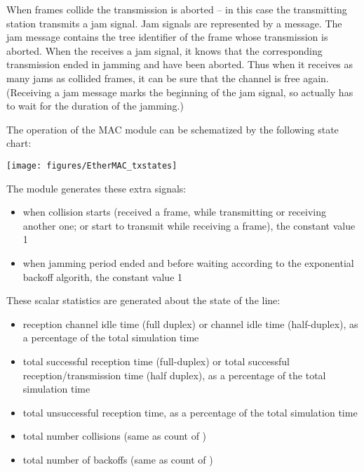 When frames collide the transmission is aborted -- in this case the transmitting
station transmits a jam signal. Jam signals are represented
by a  message. The jam message contains the tree identifier
of the frame whose transmission is aborted. When the  receives a jam
signal, it knows that the corresponding transmission ended in jamming and have
been aborted. Thus when it receives as many jams as collided frames, it can
be sure that the channel is free again. (Receiving a jam message marks the
beginning of the jam signal, so actually has to wait for the duration of the jamming.)

The operation of the MAC module can be schematized by the following state chart:

\begin{center}
\texttt{[image: figures/EtherMAC\_txstates]}
\end{center}

The module generates these extra signals:
\begin{itemize}
\item {} when collision starts (received a frame,
         while transmitting or receiving another one; or start to transmit while receiving a frame),
         the constant value 1
\item {} when jamming period ended and before waiting according to the
         exponential backoff algorith, the constant value 1
\end{itemize}

These scalar statistics are generated about the state of the line:
\begin{itemize}
  \item {} reception channel idle time (full duplex) or channel
         idle time (half-duplex), as a percentage of the total simulation time
  \item {} total successful reception time (full-duplex) or total
         successful reception/transmission time (half duplex), as a percentage
         of the total simulation time
  \item {} total unsuccessful reception time, as a percentage
         of the total simulation time
  \item {} total number collisions (same as count of )
  \item {} total number of backoffs (same as count of )
\end{itemize}

